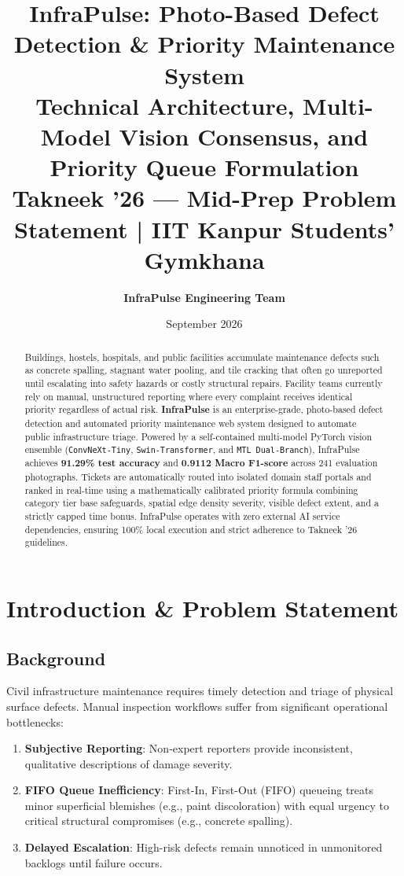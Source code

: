 \documentclass[11pt,a4paper]{article}
\title{\textbf{InfraPulse: Photo-Based Defect Detection \& Priority Maintenance System}\\[0.5em]
\large Technical Architecture, Multi-Model Vision Consensus, and Priority Queue Formulation\\[0.3em]
\small \textbf{Takneek '26 — Mid-Prep Problem Statement} | IIT Kanpur Students' Gymkhana}
\author{\textbf{InfraPulse Engineering Team}}
\date{September 2026}
\begin{document}
\maketitle

\begin{abstract}
Buildings, hostels, hospitals, and public facilities accumulate maintenance defects such as concrete spalling, stagnant water pooling, and tile cracking that often go unreported until escalating into safety hazards or costly structural repairs. Facility teams currently rely on manual, unstructured reporting where every complaint receives identical priority regardless of actual risk. \textbf{InfraPulse} is an enterprise-grade, photo-based defect detection and automated priority maintenance web system designed to automate public infrastructure triage. Powered by a self-contained multi-model PyTorch vision ensemble (\texttt{ConvNeXt-Tiny}, \texttt{Swin-Transformer}, and \texttt{MTL Dual-Branch}), InfraPulse achieves \textbf{91.29\% test accuracy} and \textbf{0.9112 Macro F1-score} across 241 evaluation photographs. Tickets are automatically routed into isolated domain staff portals and ranked in real-time using a mathematically calibrated priority formula combining category tier base safeguards, spatial edge density severity, visible defect extent, and a strictly capped time bonus. InfraPulse operates with zero external AI service dependencies, ensuring 100\% local execution and strict adherence to Takneek '26 guidelines.
\end{abstract}

\tableofcontents
\newpage

\section{Introduction \& Problem Statement}

\subsection{Background}
Civil infrastructure maintenance requires timely detection and triage of physical surface defects. Manual inspection workflows suffer from significant operational bottlenecks:
\begin{enumerate}
    \item \textbf{Subjective Reporting}: Non-expert reporters provide inconsistent, qualitative descriptions of damage severity.
    \item \textbf{FIFO Queue Inefficiency}: First-In, First-Out (FIFO) queueing treats minor superficial blemishes (e.g., paint discoloration) with equal urgency to critical structural compromises (e.g., concrete spalling).
    \item \textbf{Delayed Escalation}: High-risk defects remain unnoticed in unmonitored backlogs until failure occurs.
\end{enumerate}
\end{document}
